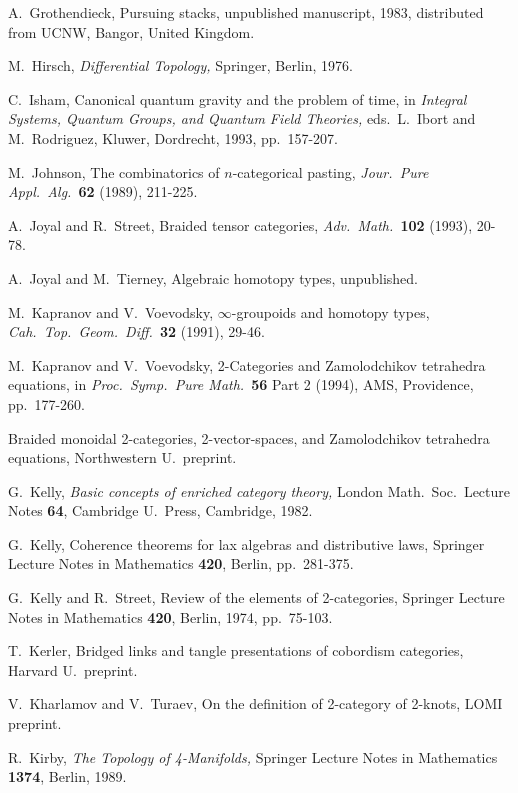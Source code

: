 \begin{thebibliography}{10}
 A.\ Grothendieck, Pursuing stacks, unpublished
manuscript, 1983, distributed from UCNW, Bangor, United Kingdom.

 M.\ Hirsch, {\sl Differential Topology,}
Springer, Berlin, 1976.

 C.\ Isham, Canonical quantum gravity and the problem of
time, in {\sl Integral Systems, Quantum Groups, and Quantum Field
Theories,} eds.\ L.\ Ibort and M.\ Rodriguez, Kluwer, Dordrecht,
1993, pp.\ 157-207.

 M.\ Johnson, The combinatorics of $n$-categorical pasting,
{\sl Jour.\ Pure Appl.\ Alg.\ }{\bf 62} (1989), 211-225.

 A.\ Joyal and R.\ Street, Braided tensor categories,
{\sl Adv.\ Math.\ }{\bf 102} (1993), 20-78.

  A.\ Joyal and M.\ Tierney, Algebraic homotopy types,
unpublished.

 M.\ Kapranov and V.\ Voevodsky,
$\infty$-groupoids and homotopy types,  {\sl Cah.\ Top.\ Geom.\
Diff.\ }{\bf 32} (1991), 29-46.

 M.\ Kapranov and V.\ Voevodsky, 2-Categories and
Zamolodchikov tetrahedra equations, in {\sl Proc.\ Symp.\ Pure
Math.\ }{\bf 56} Part 2 (1994), AMS, Providence, pp.\ 177-260.

Braided monoidal 2-categories, 2-vector-spaces, and Zamolodchikov
tetrahedra equations, Northwestern U.\ preprint.

 G.\ Kelly, {\sl Basic concepts of enriched
category theory,} London Math.\ Soc.\ Lecture Notes {\bf 64},
Cambridge U.\ Press, Cambridge, 1982.

 G.\ Kelly, Coherence theorems for lax algebras
and distributive laws, Springer Lecture Notes in Mathematics
{\bf 420}, Berlin, pp.\ 281-375.

 G.\ Kelly and R.\ Street, Review of the elements of
2-categories, Springer Lecture Notes
in Mathematics {\bf 420}, Berlin, 1974, pp.\ 75-103.

 T.\ Kerler, Bridged links and tangle
presentations of cobordism categories, Harvard U.\ preprint.

 V.\ Kharlamov and V.\ Turaev, On the definition of
2-category of 2-knots, LOMI preprint.

 R.\ Kirby, {\sl The Topology of 4-Manifolds,}
Springer Lecture Notes in Mathematics {\bf 1374}, Berlin, 1989.


\end{thebibliography}
